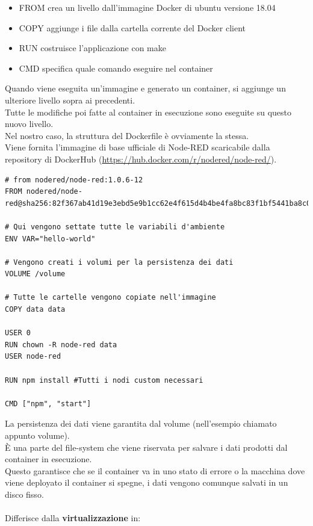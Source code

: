 \documentclass[a4paper,10pt]{memoir}
\begin{document}
\begin{itemize}
    \item FROM crea un livello dall'immagine Docker di ubuntu versione 18.04
    \item COPY aggiunge i file dalla cartella corrente del Docker client
    \item RUN costruisce l'applicazione con make
    \item CMD specifica quale comando eseguire nel container
\end{itemize}
Quando viene eseguita un'immagine e generato un container, si aggiunge un ulteriore livello sopra ai precedenti.
\\
Tutte le modifiche poi fatte al container in esecuzione sono eseguite su questo nuovo livello.
\\
Nel nostro caso, la struttura del Dockerfile è ovviamente la stessa.
\\
Viene fornita l'immagine di base ufficiale di Node-RED scaricabile dalla repository di DockerHub (\href{https://hub.docker.com/r/nodered/node-red/}{https://hub.docker.com/r/nodered/node-red/}).
\\
\begin{lstlisting}[language=docker]
# from nodered/node-red:1.0.6-12
FROM nodered/node-red@sha256:82f367ab41d19e3ebd5e9b1cc62e4f615d4b4be4fa8bc83f1bf5441ba8c0d32a

# Qui vengono settate tutte le variabili d'ambiente
ENV VAR="hello-world"

# Vengono creati i volumi per la persistenza dei dati
VOLUME /volume

# Tutte le cartelle vengono copiate nell'immagine
COPY data data

USER 0
RUN chown -R node-red data
USER node-red

RUN npm install #Tutti i nodi custom necessari

CMD ["npm", "start"]
\end{lstlisting}
\clearpage

La persistenza dei dati viene garantita dal volume (nell'esempio chiamato appunto volume). 
\\
È una parte del file-system che viene riservata per salvare i dati prodotti dal container in esecuzione.
\\
Questo garantisce che se il container va in uno stato di errore o la macchina dove viene deployato il container si spegne, i dati vengono comunque salvati in un disco fisso.
\\
\\
Differisce dalla \textbf{virtualizzazione} in:
\end{document}
